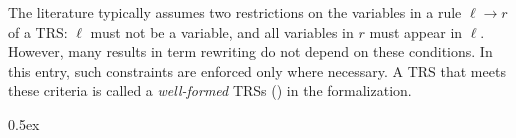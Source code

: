\documentclass[11pt,a4paper]{article}
\begin{document}
The literature typically assumes two restrictions on the variables in a rule
$\ell \to r$ of a TRS: $\ell$ must not be a variable, and all variables in $r$
must appear in $\ell$. However, many results in term rewriting do not depend
on these conditions. In this entry, such constraints are enforced only where
necessary. A TRS that meets these criteria is called a \emph{well-formed} TRSs
() in the formalization.

\parindent 0pt\parskip 0.5ex





\end{document}
